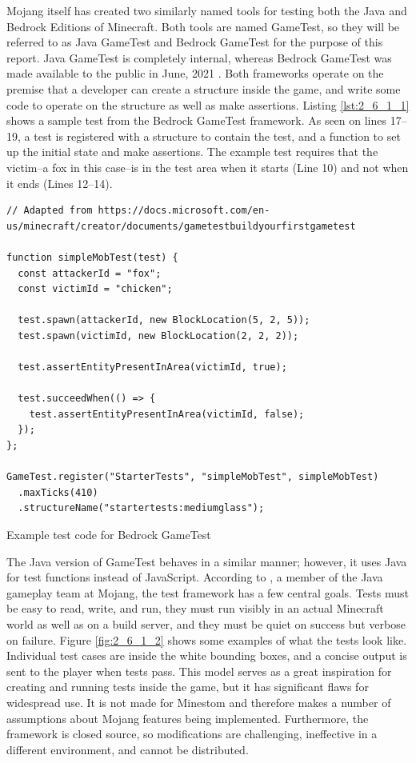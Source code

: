 \documentclass[12pt]{article}
\newenvironment{longcode}{\captionsetup{type=listing}}{}
\begin{document}
\begin{onehalfspacing}
Mojang itself has created two similarly named tools for testing both the
Java and Bedrock Editions of Minecraft. Both tools are named GameTest,
so they will be referred to as Java GameTest and Bedrock GameTest for
the purpose of this report. Java GameTest is completely internal,
whereas Bedrock GameTest was made available to the public in June, 2021
\parencite{ammerlaan2021}. Both frameworks operate on the premise that a
developer can create a structure inside the game, and write some code to
operate on the structure as well as make assertions. Listing \ref{lst:2_6_1_1}
shows a sample test from the Bedrock GameTest framework. As seen on
lines 17--19, a test is registered with a structure to contain the test,
and a function to set up the initial state and make assertions. The
example test requires that the victim--a fox in this case--is in the
test area when it starts (Line 10) and not when it ends (Lines 12--14).


\begin{longcode}
\begin{verbatim}
// Adapted from https://docs.microsoft.com/en-us/minecraft/creator/documents/gametestbuildyourfirstgametest

function simpleMobTest(test) {
  const attackerId = "fox";
  const victimId = "chicken";

  test.spawn(attackerId, new BlockLocation(5, 2, 5));
  test.spawn(victimId, new BlockLocation(2, 2, 2));

  test.assertEntityPresentInArea(victimId, true);

  test.succeedWhen(() => {
    test.assertEntityPresentInArea(victimId, false);
  });
};

GameTest.register("StarterTests", "simpleMobTest", simpleMobTest)
  .maxTicks(410)
  .structureName("startertests:mediumglass");

\end{verbatim}
\caption{Example test code for Bedrock GameTest}
\label{lst:2_6_1_1}
\end{longcode}

The Java version of GameTest behaves in a similar manner; however, it
uses Java for test functions instead of JavaScript. According to \textcite{knilberg2020}, a member of the Java gameplay team at Mojang, the test
framework has a few central goals. Tests must be easy to read, write,
and run, they must run visibly in an actual Minecraft world as well as
on a build server, and they must be quiet on success but verbose on
failure. Figure \ref{fig:2_6_1_2} shows some examples of what the tests look like.
Individual test cases are inside the white bounding boxes, and a concise
output is sent to the player when tests pass. This model serves as a
great inspiration for creating and running tests inside the game, but it
has significant flaws for widespread use. It is not made for Minestom
and therefore makes a number of assumptions about Mojang features being
implemented. Furthermore, the framework is closed source, so
modifications are challenging, ineffective in a different environment,
and cannot be distributed.


\end{onehalfspacing}
\end{document}
